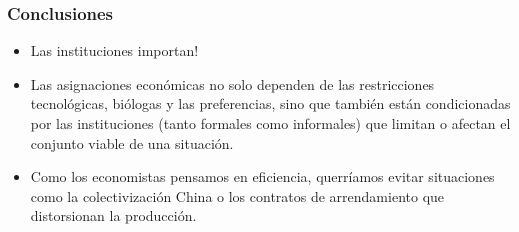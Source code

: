 \documentclass{beamer}
\begin{document}
\begin{frame}
\frametitle{Conclusiones}
\begin{itemize}
    \item Las instituciones importan! \vspace{1mm}
    \item Las asignaciones económicas no solo dependen de las restricciones tecnológicas, biólogas y las preferencias, sino que también están condicionadas por las instituciones (tanto formales como informales) que limitan o afectan el conjunto viable de una situación.\vspace{1mm}
    \item Como los economistas pensamos en eficiencia,  querríamos evitar situaciones como la colectivización China o los contratos de arrendamiento que distorsionan la producción.
\end{itemize}
\end{frame}
\end{document}

